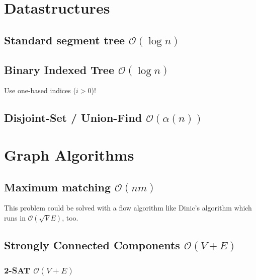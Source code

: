 \documentclass[8pt,a4paper,landscape,oneside]{amsart}
\begin{document}
\begin{multicols*}{3}


\section{Datastructures}
\subsection{Standard segment tree $\mathcal{O}(\log n)$}



\subsection{Binary Indexed Tree $\mathcal{O}(\log n)$}

Use one-based indices ($i > 0$)!



\subsection{Disjoint-Set / Union-Find $\mathcal{O}(\alpha (n))$}



\section{Graph Algorithms}
\subsection{Maximum matching $\mathcal{O}(n m)$}

This problem could be solved with a flow algorithm like Dinic's algorithm which runs in $\mathcal{O} (\sqrt{V} E)$, too.



\subsection{Strongly Connected Components $\mathcal{O}(V + E)$}



\subsubsection{2-SAT $\mathcal{O}(V+E)$}


\end{multicols*}
\end{document}
